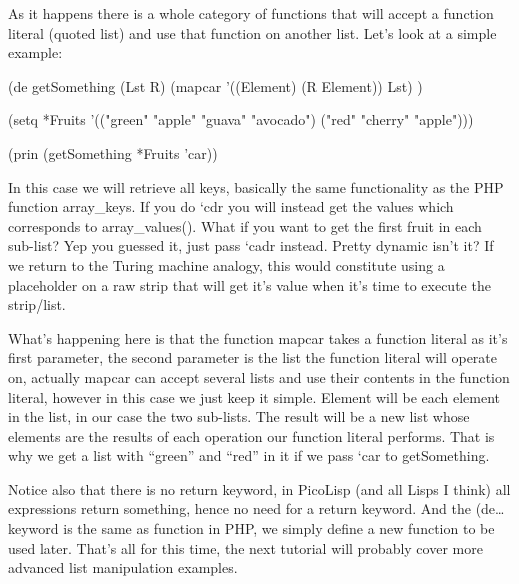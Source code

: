 As it happens there is a whole category of functions that will accept a
function literal (quoted list) and use that function on another list.
Let's look at a simple example:

\begin{wideverbatim}
(de getSomething (Lst R)
    (mapcar '((Element) (R Element)) Lst) )

(setq *Fruits 
      '(("green" "apple" "guava" "avocado") 
        ("red" "cherry" "apple")))

(prin (getSomething *Fruits 'car))
\end{wideverbatim}

In this case we will retrieve all keys, basically the same functionality
as the PHP function array\_keys. If you do ‘cdr you will instead get the
values which corresponds to array\_values(). What if you want to get the
first fruit in each sub-list? Yep you guessed it, just pass ‘cadr
instead. Pretty dynamic isn't it? If we return to the Turing machine
analogy, this would constitute using a placeholder on a raw strip that
will get it's value when it's time to execute the strip/list.

What's happening here is that the function mapcar takes a function
literal as it's first parameter, the second parameter is the list the
function literal will operate on, actually mapcar can accept several
lists and use their contents in the function literal, however in this
case we just keep it simple. Element will be each element in the list,
in our case the two sub-lists. The result will be a new list whose
elements are the results of each operation our function literal
performs. That is why we get a list with ``green'' and ``red'' in it if we
pass ‘car to getSomething.

Notice also that there is no return keyword, in PicoLisp (and all Lisps
I think) all expressions return something, hence no need for a return
keyword. And the (de… keyword is the same as function in PHP, we simply
define a new function to be used later. That's all for this time, the
next tutorial will probably cover more advanced list manipulation
examples.


